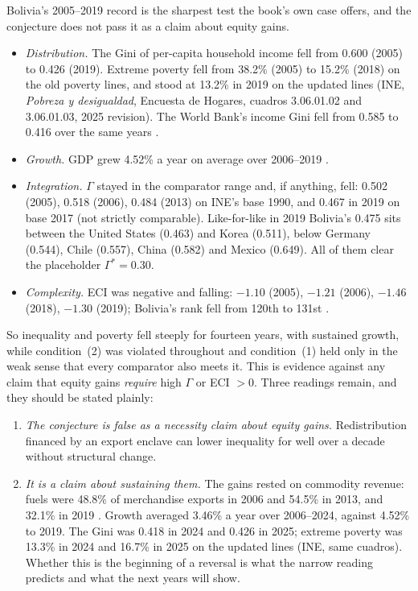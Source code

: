 \documentclass[../structural_economics_book.tex]{subfiles}
\begin{document}
\begin{remark}\label{ch26:rem:bolivia}
Bolivia's 2005--2019 record is the sharpest test the book's own case offers, and the conjecture does not pass it as a claim about equity gains.
\begin{itemize}
\item \emph{Distribution.} The Gini of per-capita household income fell from 0.600 (2005) to 0.426 (2019). Extreme poverty fell from 38.2\% (2005) to 15.2\% (2018) on the old poverty lines, and stood at 13.2\% in 2019 on the updated lines (INE, \textit{Pobreza y desigualdad}, Encuesta de Hogares, cuadros 3.06.01.02 and 3.06.01.03, 2025 revision). The World Bank's income Gini fell from 0.585 to 0.416 over the same years \citep{worldbank2026pip}.
\item \emph{Growth.} GDP grew 4.52\% a year on average over 2006--2019 \citep{worldbank2026wdi}.
\item \emph{Integration.} $\Gamma$ stayed in the comparator range and, if anything, fell: 0.502 (2005), 0.518 (2006), 0.484 (2013) on INE's base 1990, and 0.467 in 2019 on base 2017 (not strictly comparable). Like-for-like in 2019 Bolivia's 0.475 sits between the United States (0.463) and Korea (0.511), below Germany (0.544), Chile (0.557), China (0.582) and Mexico (0.649). All of them clear the placeholder $\Gamma^* = 0.30$.
\item \emph{Complexity.} ECI was negative and falling: $-1.10$ (2005), $-1.21$ (2006), $-1.46$ (2018), $-1.30$ (2019); Bolivia's rank fell from 120th to 131st \citep{growthlab2026atlas}.
\end{itemize}
So inequality and poverty fell steeply for fourteen years, with sustained growth, while condition~(2) was violated throughout and condition~(1) held only in the weak sense that every comparator also meets it. This is evidence against any claim that equity gains \emph{require} high $\Gamma$ or ECI $> 0$. Three readings remain, and they should be stated plainly:
\begin{enumerate}
\item \emph{The conjecture is false as a necessity claim about equity gains.} Redistribution financed by an export enclave can lower inequality for well over a decade without structural change.
\item \emph{It is a claim about sustaining them.} The gains rested on commodity revenue: fuels were 48.8\% of merchandise exports in 2006 and 54.5\% in 2013, and 32.1\% in 2019 \citep{worldbank2026wdi}. Growth averaged 3.46\% a year over 2006--2024, against 4.52\% to 2019. The Gini was 0.418 in 2024 and 0.426 in 2025; extreme poverty was 13.3\% in 2024 and 16.7\% in 2025 on the updated lines (INE, same cuadros). Whether this is the beginning of a reversal is what the narrow reading predicts and what the next years will show.

\end{enumerate}
\end{remark}
\end{document}
